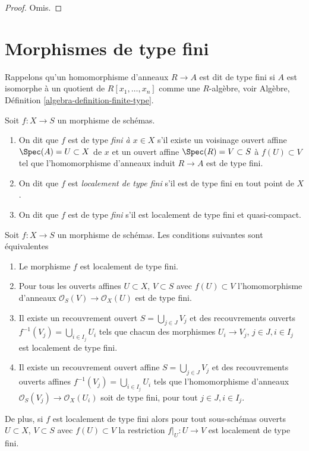 \begin{proof}
Omis.
\end{proof}








\section{Morphismes de type fini}
\label{section-finite-type}

\noindent
Rappelons qu'un homomorphisme d'anneaux $R \to A$ est dit de type
fini si $A$ est isomorphe à un quotient de $R[x_1, \ldots, x_n]$ comme une $R$-algèbre,
voir Algèbre, Définition \ref{algebra-definition-finite-type}.

\begin{definition}
\label{definition-finite-type}
Soit $f : X \to S$ un morphisme de schémas.
\begin{enumerate}
\item On dit que $f$ est de type {\it fini
à $x \in X$} s'il existe un voisinage ouvert affine $\Spec(A) = U \subset X$
de $x$ et un ouvert affine $\Spec(R) = V \subset S$
à $f(U) \subset V$ tel que l'homomorphisme d'anneaux induit
$R \to A$ est de type fini.
\item On dit que $f$ est {\it localement de type fini}
s'il est de type fini en tout point de $X$.
\item On dit que $f$ est de type {\it fini} s'il est localement
de type fini et quasi-compact.
\end{enumerate}
\end{definition}

\begin{lemma}
\label{lemma-locally-finite-type-characterize}
Soit $f : X \to S$ un morphisme de schémas. Les conditions
suivantes sont équivalentes
\begin{enumerate}
\item Le morphisme $f$ est localement de type fini.
\item Pour tous les ouverts affines $U \subset X$, $V \subset S$
avec $f(U) \subset V$ l'homomorphisme
d'anneaux $\mathcal{O}_S(V) \to \mathcal{O}_X(U)$ est de type fini.
\item Il existe un recouvrement ouvert $S = \bigcup_{j \in J} V_j$ et
des recouvrements ouverts $f^{-1}(V_j) = \bigcup_{i \in I_j} U_i$ tels que chacun
des morphismes $U_i \to V_j$, $j\in J, i\in I_j$ est localement
de type fini.
\item Il existe un recouvrement ouvert affine $S = \bigcup_{j \in J} V_j$
et des recouvrements ouverts affines $f^{-1}(V_j) = \bigcup_{i \in I_j} U_i$ tels
que l'homomorphisme d'anneaux $\mathcal{O}_S(V_j) \to \mathcal{O}_X(U_i)$ soit de
type fini, pour tout $j\in J, i\in I_j$.
\end{enumerate}
De plus, si $f$ est localement de type fini alors
pour tout sous-schémas ouverts $U \subset X$, $V \subset S$ avec $f(U) \subset V$
la restriction $f|_U : U \to V$ est localement de type fini.
\end{lemma}

